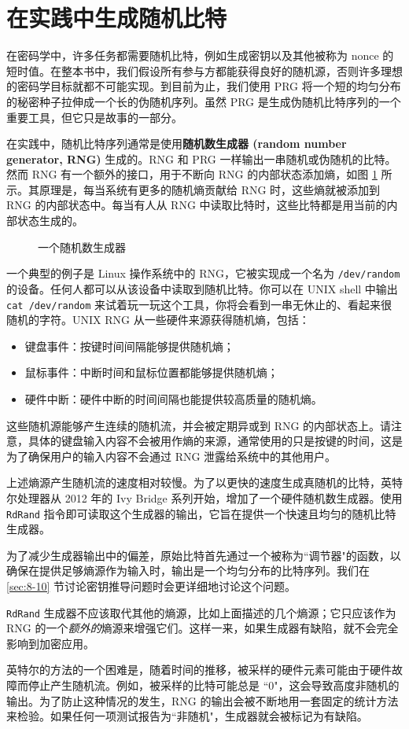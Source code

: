 \section{在实践中生成随机比特}\label{sec:3-10}

在密码学中，许多任务都需要随机比特，例如生成密钥以及其他被称为 nonce 的短时值。在整本书中，我们假设所有参与方都能获得良好的随机源，否则许多理想的密码学目标就都不可能实现。到目前为止，我们使用 PRG 将一个短的均匀分布的秘密种子拉伸成一个长的伪随机序列。虽然 PRG 是生成伪随机比特序列的一个重要工具，但它只是故事的一部分。

在实践中，随机比特序列通常是使用\textbf{随机数生成器 (random number generator, RNG)} 生成的。RNG 和 PRG 一样输出一串随机或伪随机的比特。然而 RNG 有一个额外的接口，用于不断向 RNG 的内部状态添加熵，如图 \ref{fig:3-14} 所示。其原理是，每当系统有更多的随机熵贡献给 RNG 时，这些熵就被添加到 RNG 的内部状态中。每当有人从 RNG 中读取比特时，这些比特都是用当前的内部状态生成的。

\begin{figure}
	\centering
	
	\caption{一个随机数生成器}
	\label{fig:3-14}
\end{figure}

一个典型的例子是 Linux 操作系统中的 RNG，它被实现成一个名为 \texttt{/dev/random} 的设备。任何人都可以从该设备中读取到随机比特。你可以在 UNIX shell 中输出 \texttt{cat /dev/random} 来试着玩一玩这个工具，你将会看到一串无休止的、看起来很随机的字符。UNIX RNG 从一些硬件来源获得随机熵，包括：
\begin{itemize}
	\item 键盘事件：按键时间间隔能够提供随机熵；
	\item 鼠标事件：中断时间和鼠标位置都能够提供随机熵；
	\item 硬件中断：硬件中断的时间间隔也能提供较高质量的随机熵。
\end{itemize}
这些随机源能够产生连续的随机流，并会被定期异或到 RNG 的内部状态上。请注意，具体的键盘输入内容不会被用作熵的来源，通常使用的只是按键的时间，这是为了确保用户的输入内容不会通过 RNG 泄露给系统中的其他用户。

\begin{snote}[高熵随机生成。]
上述熵源产生随机流的速度相对较慢。为了以更快的速度生成真随机的比特，英特尔处理器从 2012 年的 Ivy Bridge 系列开始，增加了一个硬件随机数生成器。使用 \texttt{RdRand} 指令即可读取这个生成器的输出，它旨在提供一个快速且均匀的随机比特生成器。

为了减少生成器输出中的偏差，原始比特首先通过一个被称为``调节器"的函数，以确保在提供足够熵源作为输入时，输出是一个均匀分布的比特序列。我们在 \ref{sec:8-10} 节讨论密钥推导问题时会更详细地讨论这个问题。

\texttt{RdRand} 生成器不应该取代其他的熵源，比如上面描述的几个熵源；它只应该作为 RNG 的一个\emph{额外的}熵源来增强它们。这样一来，如果生成器有缺陷，就不会完全影响到加密应用。

英特尔的方法的一个困难是，随着时间的推移，被采样的硬件元素可能由于硬件故障而停止产生随机流。例如，被采样的比特可能总是 ``$0$"，这会导致高度非随机的输出。为了防止这种情况的发生，RNG 的输出会被不断地用一套固定的统计方法来检验。如果任何一项测试报告为``非随机"，生成器就会被标记为有缺陷。
\end{snote}